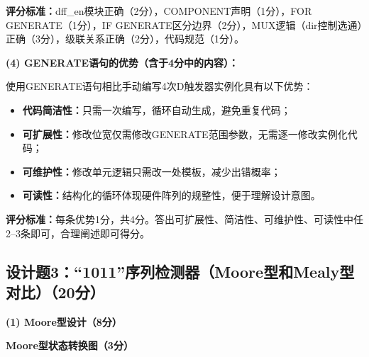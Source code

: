 \textbf{评分标准：}dff\_en模块正确（2分），COMPONENT声明（1分），FOR GENERATE（1分），IF GENERATE区分边界（2分），MUX逻辑（dir控制选通）正确（3分），级联关系正确（2分），代码规范（1分）。

\vspace{0.3cm}

\textbf{(4) GENERATE语句的优势（含于4分中的内容）：}

使用GENERATE语句相比手动编写4次D触发器实例化具有以下优势：
\begin{itemize}
  \item \textbf{代码简洁性：}只需一次编写，循环自动生成，避免重复代码；
  \item \textbf{可扩展性：}修改位宽仅需修改GENERATE范围参数，无需逐一修改实例化代码；
  \item \textbf{可维护性：}修改单元逻辑只需改一处模板，减少出错概率；
  \item \textbf{可读性：}结构化的循环体现硬件阵列的规整性，便于理解设计意图。
\end{itemize}

\textbf{评分标准：}每条优势1分，共4分。答出可扩展性、简洁性、可维护性、可读性中任2--3条即可，合理阐述即可得分。

\subsection{设计题3：``1011''序列检测器（Moore型和Mealy型对比）（20分）}

\textbf{(1) Moore型设计（8分）}

\textbf{Moore型状态转换图（3分）}

